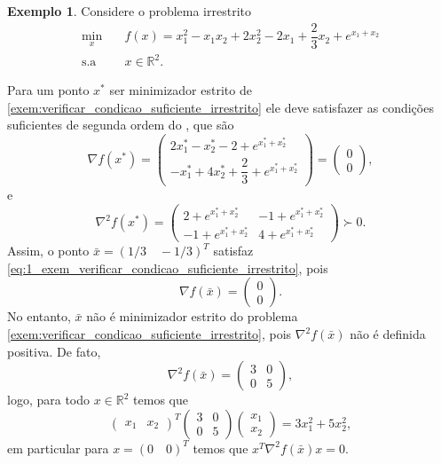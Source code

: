 \documentclass[12pt,a4paper]{scrartcl}
\def\RR{\mathds{R}}
\theoremstyle{definition}%
\newtheorem{exem}{Exemplo}
\begin{document}
\begin{exem}
Considere o problema irrestrito
\[\begin{aligned} \label{exem:verificar_condicao_suficiente_irrestrito}
\min_{x} & \quad f(x) = x_{1}^{2} - x_{1} x_{2} + 2x_{2}^{2} - 2x_{1} + \dfrac{2}{3}x_{2} + e^{x_{1}+x_{2}}  \\
\text{s.a} & \quad x\in \RR^{2} .
\end{aligned} \]
\end{exem}
Para um ponto $x^{*}$ ser minimizador estrito de \eqref{exem:verificar_condicao_suficiente_irrestrito} ele deve satisfazer as condições suficientes de segunda ordem do , que são
\[ \label{eq:1_exem_verificar_condicao_suficiente_irrestrito}
\nabla f(x^{*}) = \left( \begin{array}{cc} 2x_{1}^{*} - x_{2}^{*} - 2 + e^{x_{1}^{*} +x_{2}^{*} } \\ -x_{1}^{*} + 4x_{2}^{*} + \dfrac{2}{3} + e^{x_{1}^{*} +x_{2}^{*} } \end{array} \right) = \left( \begin{array}{cc} 0 \\ 0 \end{array} \right) ,
\]
e
\[ \label{eq:2_exem_verificar_condicao_suficiente_irrestrito}
\nabla^{2} f(x^{*}) = \left( \begin{array}{cc} 2 + e^{x_{1}^{*} +x_{2}^{*} } & -1 + e^{x_{1}^{*} +x_{2}^{*} } \\ -1 + e^{x_{1}^{*} +x_{2}^{*} } & 4 + e^{x_{1}^{*} +x_{2}^{*} } \end{array} \right) \succ 0 .
\]
Assim, o ponto $\bar{x} = (1/3\quad -1/3 )^{T}$ satisfaz \eqref{eq:1_exem_verificar_condicao_suficiente_irrestrito}, pois
\[
\nabla f(\bar{x}) = \left( \begin{array}{cc} 0 \\ 0 \end{array} \right) .
\]
No entanto, $\bar{x}$ não é minimizador estrito do problema \eqref{exem:verificar_condicao_suficiente_irrestrito}, pois $\nabla^{2} f(\bar{x})$ não é definida positiva. De fato,
\[
\nabla^{2} f(\bar{x}) = \left( \begin{array}{cc} 3 & 0 \\ 0 & 5 \end{array} \right) ,
\]
logo, para todo $x \in \RR^{2}$ temos que
\[
\left( \begin{array}{cc} x_{1} & x_{2} \end{array} \right)^{T} \left( \begin{array}{cc} 3 & 0 \\ 0 & 5 \end{array} \right) \left( \begin{array}{cc} x_{1} \\ x_{2} \end{array} \right) = 3x_{1}^{2} + 5x_{2}^{2} ,
\]
em particular para $x= (0 \quad 0)^{T}$ temos que $x^{T} \nabla^{2} f(\bar{x}) x = 0$.
\end{document}
